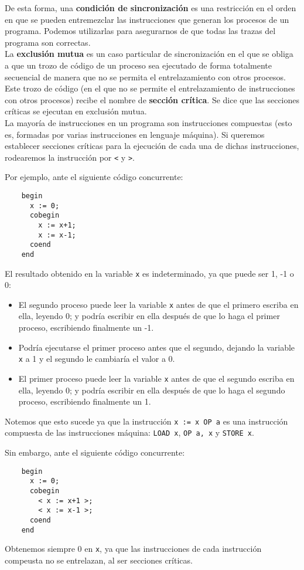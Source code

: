 De esta forma, una \textbf{condición de sincronización} es una restricción en el orden en que se pueden entremezclar las instrucciones que generan los procesos de un programa. Podemos utilizarlas para asegurarnos de que todas las trazas del programa son correctas.\\

La \textbf{exclusión mutua} es un caso particular de sincronización en el que se obliga a que un trozo de código de un proceso sea ejecutado de forma totalmente secuencial de manera que no se permita el entrelazamiento con otros procesos. Este trozo de código (en el que no se permite el entrelazamiento de instrucciones con otros procesos) recibe el nombre de \textbf{sección crítica}. Se dice que las secciones críticas se ejecutan en exclusión mutua.\\

La mayoría de instrucciones en un programa son instrucciones compuestas (esto es, formadas por varias instrucciones en lenguaje máquina). Si queremos establecer secciones críticas para la ejecución de cada una de dichas instrucciones, rodearemos la instrucción por \verb|<| y \verb|>|.

\begin{ejemplo}
    Por ejemplo, ante el siguiente código concurrente:
    \begin{verbatim}
    begin
      x := 0;
      cobegin
        x := x+1;
        x := x-1;
      coend
    end
    \end{verbatim}
    El resultado obtenido en la variable \verb|x| es indeterminado, ya que puede ser 1, -1 o 0:
    \begin{itemize}
        \item El segundo proceso puede leer la variable \verb|x| antes de que el primero escriba en ella, leyendo 0; y podría escribir en ella después de que lo haga el primer proceso, escribiendo finalmente un -1.
        \item Podría ejecutarse el primer proceso antes que el segundo, dejando la variable \verb|x| a 1 y el segundo le cambiaría el valor a 0.
        \item El primer proceso puede leer la variable \verb|x| antes de que el segundo escriba en ella, leyendo 0; y podría escribir en ella después de que lo haga el segundo proceso, escribiendo finalmente un 1.
    \end{itemize}
    Notemos que esto sucede ya que la instrucción \verb|x := x OP a| es una instrucción compuesta de las instrucciones máquina: \verb|LOAD x|, \verb|OP a, x| y \verb|STORE x|.

    Sin embargo, ante el siguiente código concurrente:
    \begin{verbatim}
    begin
      x := 0;
      cobegin
        < x := x+1 >;
        < x := x-1 >;
      coend
    end
    \end{verbatim}
    Obtenemos siempre 0 en \verb|x|, ya que las instrucciones de cada instrucción compeusta no se entrelazan, al ser secciones críticas. 
\end{ejemplo}

